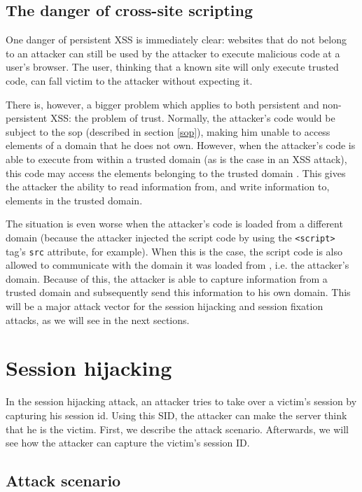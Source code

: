 \subsection{The danger of cross-site scripting}\label{xss-problem}

One danger of persistent XSS is immediately clear: websites that do not belong to an attacker can still be used by the attacker to execute malicious code at a user's browser. The user, thinking that a known site will only execute trusted code, can fall victim to the attacker without expecting it.

There is, however, a bigger problem which applies to both persistent and non-persistent XSS: the problem of trust. Normally, the attacker's code would be subject to the \gls{sop} (described in section \ref{sop}), making him unable to access elements of a domain that he does not own. However, when the attacker's code is able to execute from within a trusted domain (as is the case in an XSS attack), this code may access the elements belonging to the trusted domain \cite{Klein2002}. This gives the attacker the ability to read information from, and write information to, elements in the trusted domain.

The situation is even worse when the attacker's code is loaded from a different domain (because the attacker injected the script code by using the \texttt{<script>} tag's \texttt{src} attribute, for example). When this is the case, the script code is also allowed to communicate with the domain it was loaded from \cite{Singh2010}, i.e. the attacker's domain. Because of this, the attacker is able to capture information from a trusted domain and subsequently send this information to his own domain. This will be a major attack vector for the session hijacking and session fixation attacks, as we will see in the next sections.

\section{Session hijacking}\label{hijacking}

In the session hijacking attack, an attacker tries to take over a victim's session by capturing his \gls{session id}. Using this SID, the attacker can make the server think that he is the victim. First, we describe the attack scenario. Afterwards, we will see how the attacker can capture the victim's session ID.

\subsection{Attack scenario}

